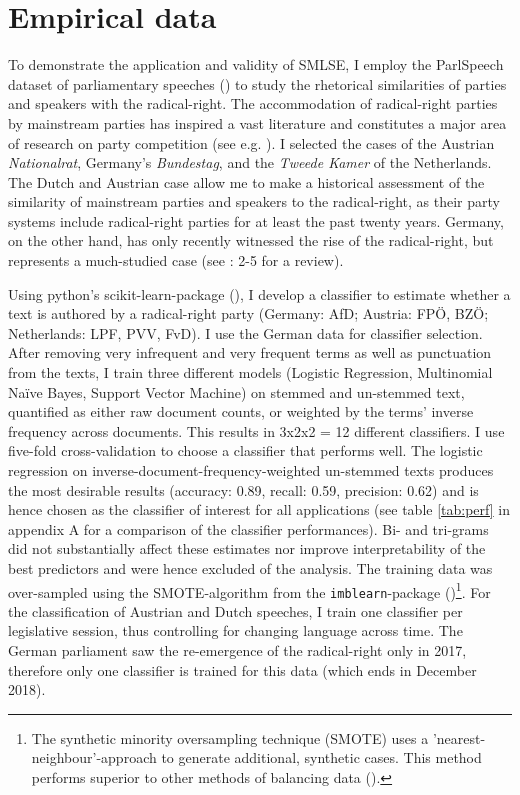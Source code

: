 \documentclass{article}
\begin{document}
\section{Empirical data}
To demonstrate the application and validity of SMLSE, I employ the ParlSpeech dataset of parliamentary speeches (\cite{Rauh2020}) to study the rhetorical similarities of parties and speakers with the radical-right. The accommodation of radical-right parties by mainstream parties has inspired a vast literature and constitutes a major area of research on party competition (see e.g. \cite{Arzheimer2009, Bale2010e, Dahlstrom2012a, Harmel1997a, Krause2019accomodation, Meguid2005, Schumacher2014a, Spoon2020a, VanDerBrug2005b, VanSpanje2010, Wagner2017}). I selected the cases of the Austrian \textit{Nationalrat}, Germany's \textit{Bundestag}, and the \textit{Tweede Kamer} of the Netherlands. The Dutch and Austrian case allow me to make a historical assessment of the similarity of mainstream parties and speakers to the radical-right, as their party systems include radical-right parties for at least the past twenty years. Germany, on the other hand, has only recently witnessed the rise of the radical-right, but represents a much-studied case (see \cite{Arzheimer2019}: 2-5 for a review).\par

Using python’s scikit-learn-package (\cite{Pedregosa2011}), I develop a classifier to estimate whether a text is authored by a radical-right party (Germany: AfD; Austria: FPÖ, BZÖ; Netherlands: LPF, PVV, FvD). I use the German data for classifier selection. After removing very infrequent and very frequent terms as well as punctuation from the texts, I train three different models (Logistic Regression, Multinomial Naïve Bayes, Support Vector Machine) on stemmed and un-stemmed text, quantified as either raw document counts, or weighted by the terms' inverse frequency across documents. This results in 3x2x2 = 12 different classifiers. I use five-fold cross-validation to choose a classifier that performs well. The logistic regression on inverse-document-frequency-weighted un-stemmed texts produces the most desirable results (accuracy: 0.89, recall: 0.59, precision: 0.62) and is hence chosen as the classifier of interest for all applications (see table \ref{tab:perf} in appendix A for a comparison of the classifier performances). Bi- and tri-grams did not substantially affect these estimates nor improve interpretability of the best predictors and were hence excluded of the analysis. The training data was over-sampled using the SMOTE-algorithm from the \texttt{imblearn}-package (\cite{Lemaitre2017})\footnote{The synthetic minority oversampling technique (SMOTE) uses a 'nearest-neighbour'-approach to generate additional, synthetic cases. This method performs superior to other methods of balancing data (\cite{Chawla2002}).}. For the classification of Austrian and Dutch speeches, I train one classifier per legislative session, thus controlling for changing language across time. The German parliament saw the re-emergence of the radical-right only in 2017, therefore only one classifier is trained for this data (which ends in December 2018). \par
\end{document}
